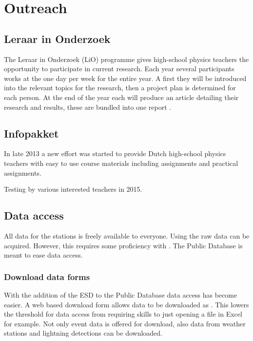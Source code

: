 \chapter{Outreach}
\label{ch:outreach}

\section{Leraar in Onderzoek}

The Leraar in Onderzoek (LiO) programme gives high-school physics
teachers the opportunity to participate in current research. Each year
several participants works at the \nikhef one day per week for the
entire year. A first they will be introduced into the relevant topics
for the research, then a project plan is determined for each person. At
the end of the year each will produce an article detailing their
research and results, these are bundled into one report
\cite{lio2009, lio2010, lio2011, lio2012}.


\section{Infopakket}

In late 2013 a new effort was started to provide Dutch high-school
physics teachers with easy to use course materials including assignments
and practical assignments.

Testing by various interested teachers in 2015.


\section{Data access}

All data for the \hisparc stations is freely available to everyone.
Using \sapphire the raw data can be acquired. However, this requires
some proficiency with \python. The Public Database is meant to ease data
access.


\subsection{Download data forms}

With the addition of the ESD to the Public Database data access has become easier. A web based download form allows data to be downloaded as \tsv. This lowers the threshold for data access from requiring \python skills to just opening a \tsv file in Excel for example. Not only \hisparc event data is offered for download, also data from \hisparc weather stations and \knmi lightning detections can be downloaded.


